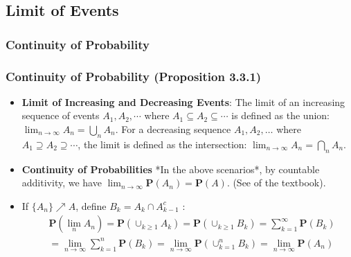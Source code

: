 \documentclass[handout]{beamer}
\newcommand{\BP}{\mathbf{P}}
\begin{document}
\subsection{Limit of Events}

\subsubsection{Continuity of Probability}


\frame
{
  \frametitle{Continuity of Probability (Proposition 3.3.1)}

   \begin{itemize}

\item<1->  \textbf{Limit of Increasing and Decreasing Events}: The limit of an increasing sequence of events $A_1, A_2,\cdots$ where $A_1\subseteq A_2\subseteq \cdots$ is defined as the union: $\lim_{n\rightarrow \infty} A_n=\bigcup_n A_n$.  For a decreasing sequence $A_1, A_2,\ldots$ where $A_1\supseteq A_2\supseteq \cdots$, the limit is defined as the intersection: $\lim_{n\rightarrow \infty} A_n=\bigcap_n A_n$. 
                       
\item<2->  \textbf{Continuity of Probabilities} *In the above scenarios*, by countable additivity, we have $\lim_{n\rightarrow \infty}\BP(A_n)=\BP(A)$.  (See  of the textbook).                                       

\item<3->  If $\{A_n\} \nearrow A$, define $B_k = A_k \cap A_{k-1}^c$ :
\begin{align*}
&\BP(\lim_n A_n) = \BP(\cup_{k\ge1} A_k) = \BP(\cup_{k\ge1} B_k) = \sum_{k = 1}^\infty \BP(B_k) \\
&= \lim_{n \to \infty} \sum_{k = 1}^n \BP(B_k) = \lim_{n \to \infty} \BP( \cup_{ k =1}^n B_k) =\lim_{n \to \infty} \BP(A_n)
\end{align*}

                  
                 \end{itemize}
}
\end{document}
